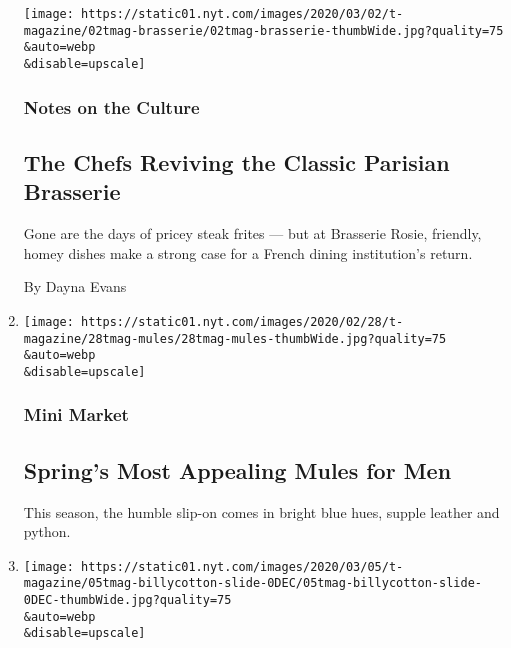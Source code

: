 \begin{enumerate}
  \texttt{[image: https://static01.nyt.com/images/2020/03/02/t-magazine/02tmag-brasserie/02tmag-brasserie-thumbWide.jpg?quality=75\\\&auto=webp\\\&disable=upscale]}

  \hypertarget{notes-on-the-culture-3}{%
  \subsubsection{Notes on the Culture}\label{notes-on-the-culture-3}}

  \hypertarget{the-chefs-reviving-the-classic-parisian-brasserie}{%
  \subsection{The Chefs Reviving the Classic Parisian
  Brasserie}\label{the-chefs-reviving-the-classic-parisian-brasserie}}

  Gone are the days of pricey steak frites --- but at Brasserie Rosie,
  friendly, homey dishes make a strong case for a French dining
  institution's return.

  By Dayna Evans
\item
  \href{/2020/02/28/t-magazine/mule-mens-shoes.html}{}

  \texttt{[image: https://static01.nyt.com/images/2020/02/28/t-magazine/28tmag-mules/28tmag-mules-thumbWide.jpg?quality=75\\\&auto=webp\\\&disable=upscale]}

  \hypertarget{mini-market}{%
  \subsubsection{Mini Market}\label{mini-market}}

  \hypertarget{springs-most-appealing-mules-for-men}{%
  \subsection{Spring's Most Appealing Mules for
  Men}\label{springs-most-appealing-mules-for-men}}

  This season, the humble slip-on comes in bright blue hues, supple
  leather and python.
\item
  \href{/slideshow/2020/02/27/t-magazine/inside-a-couples-tranquil-greek-revival-home-in-upstate-new-york.html}{}

  \texttt{[image: https://static01.nyt.com/images/2020/03/05/t-magazine/05tmag-billycotton-slide-0DEC/05tmag-billycotton-slide-0DEC-thumbWide.jpg?quality=75\\\&auto=webp\\\&disable=upscale]}


\end{enumerate}
